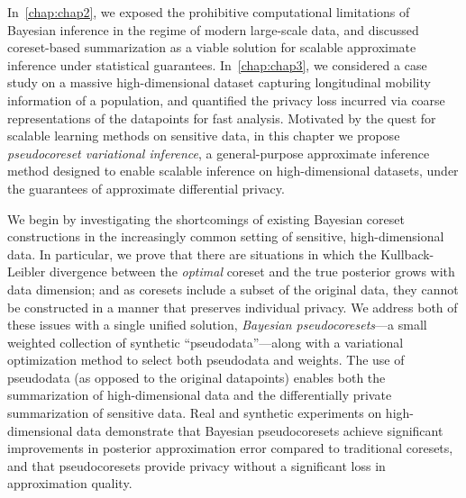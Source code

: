In~\cref{chap:chap2}, we exposed the prohibitive computational limitations of Bayesian inference in the regime of modern large-scale data, and discussed coreset-based summarization as a viable solution for scalable approximate inference under statistical guarantees. In~\cref{chap:chap3}, we considered a case study on a massive high-dimensional dataset capturing longitudinal mobility information of a population, and quantified the privacy loss incurred via coarse representations of the datapoints for fast analysis.
Motivated by the quest for scalable learning methods on sensitive data, in this chapter we propose \emph{pseudocoreset  variational inference}, a general-purpose approximate inference method designed to enable scalable inference on high-dimensional datasets, under the guarantees of approximate differential privacy.

We begin by investigating the shortcomings of existing Bayesian coreset constructions 
in the increasingly common setting of sensitive, high-dimensional data. 
In particular, we prove that there are situations in which 
the Kullback-Leibler divergence between the \emph{optimal} coreset 
and the true posterior grows with data dimension; and as coresets include
a subset of the original data, they cannot be constructed in a manner
that preserves individual privacy.
We address both of these issues with a single unified solution, \emph{Bayesian
pseudocoresets}---a small weighted collection of synthetic
``pseudodata''---along with a variational optimization method to select both
pseudodata and weights.  The use of pseudodata (as opposed to
the original datapoints) enables both the summarization of high-dimensional data
and the  differentially private summarization of
sensitive data. Real and
synthetic experiments on high-dimensional data demonstrate that Bayesian 
pseudocoresets achieve significant improvements in posterior approximation error compared to
traditional coresets, and that pseudocoresets provide privacy without
a significant loss in approximation quality. 


